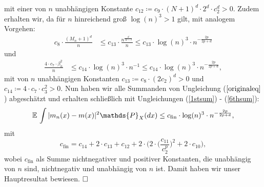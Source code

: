 mit einer von $n$ unabhängigen Konstante $c_{12} \coloneqq c_9 \cdot (N + 1)^d \cdot 2^d \cdot c_2^d > 0.$
Zudem erhalten wir, da für $n$ hinreichend groß $\log(n)^3 > 1$ gilt, mit analogem Vorgehen:
\begin{equation}
\label{5thsum}
\begin{split}
c_8 \cdot \frac{(M_n + 1)^d}{n} & \leq c_{13} \cdot \frac{n^{\frac{d}{2p + d}}}{n} \leq c_{13} \cdot \log(n)^3 \cdot n^{- \frac{2p}{2p + d}} 
\end{split}
\end{equation} 
und 
\begin{equation}
\label{6thsum}
\begin{split}
\frac{4 \cdot c_7 \cdot \beta_n^2}{n} & \leq c_{14} \cdot \log(n)^3 \cdot n^{-1} \leq c_{14} \cdot \log(n)^3 \cdot n^{- \frac{2p}{2p + d}},
\end{split}
\end{equation} 
mit von $n$ unabhängigen Konstanten $c_{13} \coloneqq c_8 \cdot (2c_2)^d > 0$ und $c_{14} \coloneqq 4 \cdot c_7 \cdot c_3^2 > 0$.
Nun haben wir alle Summanden von Ungleichung ($\ref{originaleq}$) abgeschätzt und erhalten schließlich mit Ungleichungen (\ref{1stsum}) - (\ref{6thsum}):
\begin{equation*}
\E \int |m_n(x) - m(x)|^2 \mathds{P}_X(dx) \leq c_{\mathrm{fin}} \cdot \log(n)^3 \cdot n^{- \frac{2p}{2p + d}},
\end{equation*}
mit 
$$c_{\mathrm{fin}} = c_{14} + 2 \cdot c_{13} + c_{12} + 2 \cdot \Bigg(2 \cdot \bigg(\frac{c_{11}}{c_2^p}\bigg)^2 + 2 \cdot  c_{10}\Bigg),$$
wobei $c_{\mathrm{fin}}$ als Summe nichtnegativer und positiver Konstanten, die unabhängig von $n$ sind, nichtnegativ und unabhängig von $n$ ist.
Damit haben wir unser Hauptresultat bewiesen. $\hfill\square$ 	